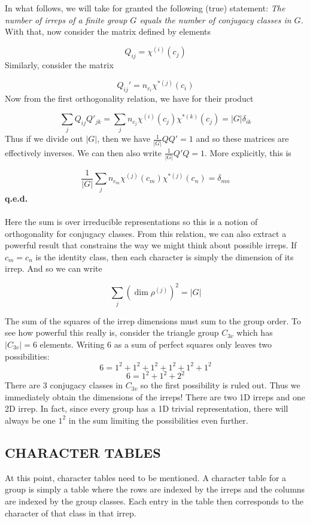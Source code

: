 \documentclass[9 pt]{report}
\begin{document}
In what follows, we will take for granted the following (true) statement:
\textit{The number of irreps of a finite group $G$ equals the number of conjugacy classes in $G$.} With that, now consider the matrix defined by elements

$$ Q_{ij} = \chi^{(i)}(c_j) $$
Similarly, consider the matrix

$$ Q_{ij}' = n_{c_i}\chi^{*(j)}(c_i) $$
Now from the first orthogonality relation, we have for their product

$$ \sum_j Q_{ij}Q'_{jk} = \sum_j n_{c_j}\chi^{(i)}(c_j)\chi^{*(k)}(c_j) = |G|\delta_{ik} $$
Thus if we divide out $|G|$, then we have $\frac{1}{|G|}QQ' = 1$ and so these matrices are effectively inverses. We can then also write $\frac{1}{|G|}Q' Q = 1$. More explicitly, this is

$$ \frac{1}{|G|}\sum_{j}n_{c_m}\chi^{(j)}(c_m)\chi^{*(j)}(c_n) = \delta_{mn} $$
\textbf{q.e.d.}
\\
\\
Here the sum is over irreducible representations so this is a notion of orthogonality for conjugacy classes. From this relation, we can also extract a powerful result that constrains the way we might think about possible irreps. If $c_m=c_n$ is the identity class, then each character is simply the dimension of its irrep. And so we can write
\begin{tcolorbox}
	$$ \sum_j (\dim \rho^{(j)})^2 = |G| $$
\end{tcolorbox}
The sum of the squares of the irrep dimensions must sum to the group order. To see how powerful this really is, consider the triangle group $C_{3v}$ which has $|C_{3v}|=6$ elements. Writing $6$ as a sum of perfect squares only leaves two possibilities:
$$ 6 = 1^2 + 1^2 + 1^2 + 1^2 + 1^2 +1^2 $$
$$ 6 = 1^2 + 1^2 + 2^2 $$
There are 3 conjugacy classes in $C_{3v}$ so the first possibility is ruled out. Thus we immediately obtain the dimensions of the irreps! There are two 1D irreps and one 2D irrep. In fact, since every group has a 1D trivial representation, there will always be one $1^2$ in the sum limiting the possibilities even further. 

{\centering
\subsection*{CHARACTER TABLES}}
At this point, character tables need to be mentioned. A character table for a group is simply a table where the rows are indexed by the irreps and the columns are indexed by the group classes. Each entry in the table then corresponds to the character of that class in that irrep. 
\end{document}
